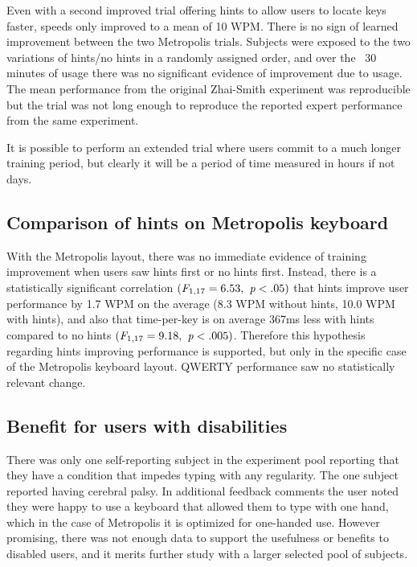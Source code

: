 \documentclass[english]{vgtc}
\begin{document}
Even with a second improved trial offering hints to allow users to locate keys faster, speeds only improved to a mean of 10 WPM.  
There is no sign of learned improvement between the two Metropolis trials.  Subjects were exposed to the two variations of hints/no hints in a
randomly assigned order, and over the ~30 minutes of usage there was no significant evidence of improvement due to usage.
The mean performance from the original Zhai-Smith experiment was reproducible but the trial was not long enough to reproduce the reported expert performance from the same experiment.

It is possible to perform an extended trial where users commit to a much longer training period,
but clearly it will be a period of time measured in hours if not days.

\subsection{Comparison of hints on Metropolis keyboard}

With the Metropolis layout, there was no immediate evidence of training improvement when users saw hints first or no hints first. Instead,
there is a statistically significant correlation $(\emph{F}_{1,17} = 6.53, \emph{ p}<.05)$ that hints improve
user performance by 1.7 WPM on the average (8.3 WPM without hints, 10.0 WPM with hints), and also that time-per-key is on average 367ms less with hints compared
to no hints $(\emph{F}_{1,17} = 9.18, \emph{ p}<.005)$.  Therefore this hypothesis regarding hints improving performance is supported, but only in the specific case of the Metropolis keyboard layout.  QWERTY performance saw no statistically relevant change.

\subsection{Benefit for users with disabilities}

There was only one self-reporting subject in the experiment pool reporting that they have a condition that impedes
typing with any regularity.  The one subject reported having cerebral palsy.
In additional feedback comments the user noted they were happy to use a keyboard that allowed them to type with one hand, which
in the case of Metropolis it is optimized for one-handed use.  However promising, there was not enough data to support
the usefulness or benefits to disabled users, and it merits further study with a larger selected pool of subjects.
\end{document}
